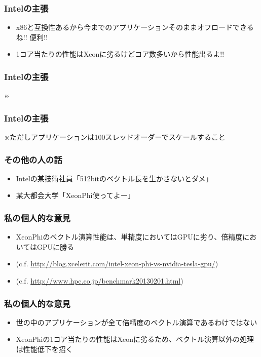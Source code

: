 \documentclass[dvipdfmx,20pt,notheorems,t]{beamer}
\begin{document}
\begin{frame}\frametitle{Intelの主張}
\begin{itemize}
\item x86と互換性あるから今までのアプリケーションそのままオフロードできるね!! 便利!!
\item 1コア当たりの性能はXeonに劣るけどコア数多いから性能出るよ!!
\end{itemize}
\end{frame}

\begin{frame}\frametitle{Intelの主張}
\Large
※
\end{frame}

\begin{frame}\frametitle{Intelの主張}
※ただしアプリケーションは100スレッドオーダーでスケールすること
\end{frame}

\begin{frame}\frametitle{その他の人の話}
\begin{itemize}
\item Intelの某技術社員「512bitのベクトル長を生かさないとダメ」
\item 某大都会大学「XeonPhi使ってよー」
\end{itemize}
\end{frame}

\begin{frame}\frametitle{私の個人的な意見}
\begin{itemize}
\item XeonPhiのベクトル演算性能は、単精度においてはGPUに劣り、倍精度においてはGPUに勝る
\item (c.f. \url{http://blog.xcelerit.com/intel-xeon-phi-vs-nvidia-tesla-gpu/})
\item (c.f. \url{http://www.hpc.co.jp/benchmark20130201.html})
\end{itemize}
\end{frame}

\begin{frame}\frametitle{私の個人的な意見}
\begin{itemize}
\item 世の中のアプリケーションが全て倍精度のベクトル演算であるわけではない
\item XeonPhiの1コア当たりの性能はXeonに劣るため、ベクトル演算以外の処理は性能低下を招く
\end{itemize}
\end{frame}
\end{document}

